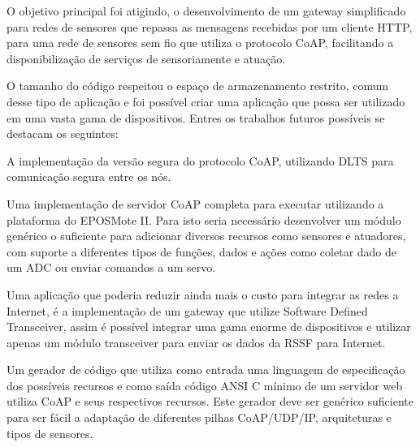 O objetivo principal foi atigindo, o desenvolvimento de um gateway simplificado para redes de sensores que repassa as mensagens recebidas por um cliente HTTP, para uma rede de sensores sem fio que utiliza o protocolo CoAP, facilitando a disponibiliza\c{c}\~ao de servi\c{c}os de sensoriamente e atua\c{c}\~ao.

O tamanho do c\'odigo respeitou o espa\c{c}o de armazenamento restrito, comum desse tipo de aplica\c{c}\~ao e foi poss\'ivel criar uma aplica\c{c}\~ao que possa ser utilizado em uma vasta gama de dispositivos. Entres os trabalhos futuros poss\'iveis se destacam os seguintes:

A implementa\c{c}\~ao da vers\~ao segura do protocolo CoAP, utilizando DLTS para comunica\c{c}\~ao segura entre os n\'os.

Uma implementa\c{c}\~ao de servidor CoAP completa para executar utilizando a plataforma do EPOSMote II. Para isto seria necess\'ario desenvolver um m\'odulo gen\'erico o suficiente para adicionar diversos recursos como sensores e atuadores, com suporte a diferentes tipos de fun\c{c}\~oes, dados e a\c{c}\~oes como coletar dado de um ADC ou enviar comandos a um servo.

Uma aplica\c{c}\~ao que poderia reduzir ainda mais o custo para integrar as redes a Internet, \'e a implementa\c{c}\~ao de um gateway que utilize Software Defined Transceiver, assim \'e poss\'ivel integrar uma gama enorme de dispositivos e utilizar apenas um m\'odulo transceiver para enviar os dados da RSSF para Internet.

Um gerador de c\'odigo que utiliza como entrada uma linguagem de especifica\c{c}\~ao dos poss\'iveis recursos e como sa\'ida c\'odigo ANSI C m\'inimo de um servidor web utiliza CoAP e seus respectivos recursos. Este gerador deve ser gen\'erico suficiente para ser f\'acil a adapta\c{c}\~ao de diferentes pilhas CoAP/UDP/IP, arquiteturas e tipos de sensores.
